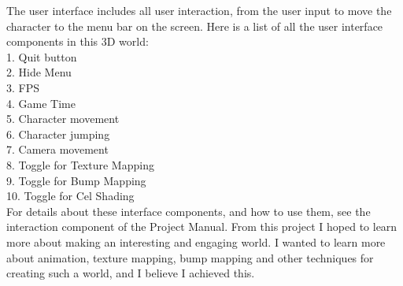 \documentclass {article}
\begin{document}
\newline
\newline
The user interface includes all user interaction, from the user input to move the character to the menu bar on the screen. Here is a list of all the user interface components in this 3D world:\\
1. Quit button\\
2. Hide Menu\\
3. FPS\\
4. Game Time\\
5. Character movement\\
6. Character jumping\\
7. Camera movement\\
8. Toggle for Texture Mapping\\
9. Toggle for Bump Mapping\\
10. Toggle for Cel Shading\\
\newline
For details about these interface components, and how to use them, see the interaction component of the Project Manual.
\newline
\newline
From this project I hoped to learn more about making an interesting and engaging world. I wanted to learn more about animation, texture mapping, bump mapping and other techniques for creating such a world, and I believe I achieved this.\\
\newpage
\end{document}
